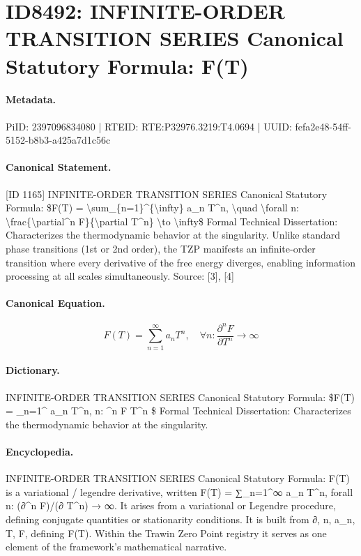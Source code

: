 \section*{ID8492: INFINITE-ORDER TRANSITION SERIES Canonical Statutory Formula: F(T)}
\paragraph{Metadata.}
PiID: 2397096834080 | RTEID: RTE:P32976.3219:T4.0694 | UUID: fefa2e48-54ff-5152-b8b3-a425a7d1c56c

\paragraph{Canonical Statement.}
[ID 1165] INFINITE-ORDER TRANSITION SERIES Canonical Statutory Formula: \$F(T) = \textbackslash{}sum\_\{n=1\}\textasciicircum{}\{\textbackslash{}infty\} a\_n T\textasciicircum{}n, \textbackslash{}quad \textbackslash{}forall n: \textbackslash{}frac\{\textbackslash{}partial\textasciicircum{}n F\}\{\textbackslash{}partial T\textasciicircum{}n\} \textbackslash{}to \textbackslash{}infty\$ Formal Technical Dissertation: Characterizes the thermodynamic behavior at the singularity. Unlike standard phase transitions (1st or 2nd order), the TZP manifests an infinite-order transition where every derivative of the free energy diverges, enabling information processing at all scales simultaneously. Source: [3], [4]

\paragraph{Canonical Equation.}
\[
F(T) = \sum_{n=1}^{\infty} a_n T^n, \quad \forall n: \frac{\partial^n F}{\partial T^n} \to \infty
\]

\paragraph{Dictionary.}
INFINITE-ORDER TRANSITION SERIES Canonical Statutory Formula: \$F(T) = \_n=1\textasciicircum{} a\_n T\textasciicircum{}n, n: \textasciicircum{}n F T\textasciicircum{}n \$ Formal Technical Dissertation: Characterizes the thermodynamic behavior at the singularity.

\paragraph{Encyclopedia.}
INFINITE-ORDER TRANSITION SERIES Canonical Statutory Formula: F(T) is a variational / legendre derivative, written F(T) = ∑\_n=1\textasciicircum{}∞ a\_n T\textasciicircum{}n, forall n: (∂\textasciicircum{}n F)/(∂ T\textasciicircum{}n) → ∞. It arises from a variational or Legendre procedure, defining conjugate quantities or stationarity conditions. It is built from ∂, n, a\_n, T, F, defining F(T). Within the Trawin Zero Point registry it serves as one element of the framework's mathematical narrative.
